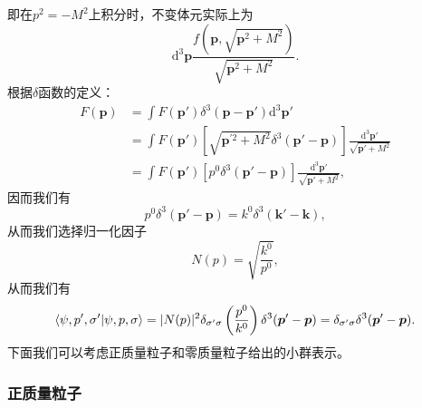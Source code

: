 即在$p^{2} =-M^{2}$上积分时，不变体元实际上为
\begin{equation*}
	\mathrm{d}^{3}\boldsymbol{p}\frac{f\left(\boldsymbol{p} ,\sqrt{\boldsymbol{p}^{2} +M^{2}}\right)}{\sqrt{\boldsymbol{p}^{2} +M^{2}}} .
\end{equation*}
根据$\delta $函数的定义：
\begin{equation*}
	\begin{aligned}
		F(\boldsymbol{p}) & =\int F(\boldsymbol{p} ') \delta ^{3}(\boldsymbol{p} -\boldsymbol{p} ')\mathrm{d}^{3}\boldsymbol{p} '\\
		& =\int F(\boldsymbol{p} ')\left[\sqrt{\boldsymbol{p} ^{\prime 2} +M^{2}} \delta ^{3}(\boldsymbol{p} '-\boldsymbol{p})\right]\frac{\mathrm{d}^{3}\boldsymbol{p} '}{\sqrt{\boldsymbol{p} '+M^{2}}}\\
		& =\int F(\boldsymbol{p} ')\left[ p^{0} \delta ^{3}(\boldsymbol{p} '-\boldsymbol{p})\right]\frac{\mathrm{d}^{3}\boldsymbol{p} '}{\sqrt{\boldsymbol{p} '+M^{2}}} ,
	\end{aligned}
\end{equation*}
因而我们有
\begin{equation*}
	p^{0} \delta ^{3} (\boldsymbol{p} '-\boldsymbol{p} )=k^{0} \delta ^{3} (\boldsymbol{k} '-\boldsymbol{k} ),
\end{equation*}
从而我们选择归一化因子
\begin{equation*}
	N( p) =\sqrt{\frac{k^{0}}{p^{0}}} ,
\end{equation*}
从而我们有
\begin{equation*}
	\bra{\psi ,p',\sigma '}\ket{\psi ,p,\sigma } =| N( p)| ^{2} \delta _{\sigma '\sigma }\left(\frac{p^{0}}{k^{0}}\right) \delta ^{3} (\boldsymbol{p} '-\boldsymbol{p} )=\delta _{\sigma '\sigma } \delta ^{3} (\boldsymbol{p} '-\boldsymbol{p} ).
\end{equation*}
下面我们可以考虑正质量粒子和零质量粒子给出的小群表示。

\subsubsection{正质量粒子}

